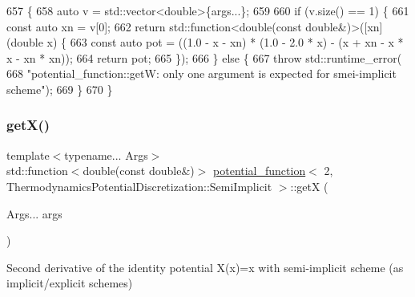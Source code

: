 \begin{DoxyCode}
657                                                         \{
658     \textcolor{keyword}{auto} v = std::vector<double>\{args...\};
659 
660     \textcolor{keywordflow}{if} (v.size() == 1) \{
661       \textcolor{keyword}{const} \textcolor{keyword}{auto} xn = v[0];
662       \textcolor{keywordflow}{return} std::function<double(const double&)>([xn](\textcolor{keywordtype}{double} x) \{
663         \textcolor{keyword}{const} \textcolor{keyword}{auto} pot = ((1.0 - x - xn) * (1.0 - 2.0 * x) - (x + xn - x * x - xn * xn));
664         \textcolor{keywordflow}{return} pot;
665       \});
666     \} \textcolor{keywordflow}{else} \{
667       \textcolor{keywordflow}{throw} std::runtime\_error(
668           \textcolor{stringliteral}{"potential\_function::getW: only one argument is expected for smei-implicit scheme"});
669     \}
670   \}
\end{DoxyCode}
\mbox{\label{structpotential__function_3_012_00_01ThermodynamicsPotentialDiscretization_1_1SemiImplicit_01_4_ac71f890ab727626f62d1cb0aa73052f8}} 
\subsubsection{\texorpdfstring{get\+X()}{getX()}}
{\footnotesize\ttfamily template$<$typename... Args$>$ \\
std\+::function$<$double(const double\&)$>$ \hyperlink{structpotential__function}{potential\+\_\+function}$<$ 2, Thermodynamics\+Potential\+Discretization\+::\+Semi\+Implicit $>$\+::getX (\begin{DoxyParamCaption}\item[{Args...}]{args }\end{DoxyParamCaption})\hspace{0.3cm}{\ttfamily [inline]}}



Second derivative of the identity potential X(x)=x with semi-\/implicit scheme (as implicit/explicit schemes) 


